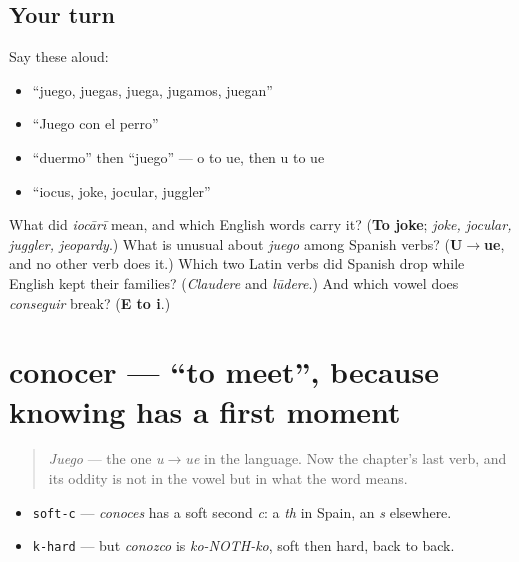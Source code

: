 \subsection*{Your turn}
Say these aloud:

\begin{itemize}
\raggedright
  \item \textquotedblleft{}juego, juegas, juega, jugamos, juegan\textquotedblright{}
  \item \textquotedblleft{}Juego con el perro\textquotedblright{}
  \item \textquotedblleft{}duermo\textquotedblright{} then \textquotedblleft{}juego\textquotedblright{} — o to ue, then u to ue
  \item \textquotedblleft{}iocus, joke, jocular, juggler\textquotedblright{}
\end{itemize}

\begin{tcolorbox}[breakable,colback=teal!4,colframe=teal!35!black,title={Before you move on}]
What did \emph{iocārī} mean, and which English words carry it? (\textbf{To joke}; \emph{joke, jocular, juggler, jeopardy}.) What is unusual about \emph{juego} among Spanish verbs? (\textbf{U$\to$ue}, and no other verb does it.) Which two Latin verbs did Spanish drop while English kept their families? (\emph{Claudere} and \emph{lūdere}.) And which vowel does \emph{conseguir} break? (\textbf{E to i}.)
\end{tcolorbox}
\section[conocer]{conocer — \textquotedblleft{}to meet\textquotedblright{}, because knowing has a first moment}

\label{lesson:ES-C39-conocer}



\begin{quote}
\emph{Juego} — the one \emph{u$\to$ue} in the language. Now the chapter's last verb, and its oddity is not in the vowel but in what the word means.
\end{quote}

\begin{sounds}
\begin{itemize}
\raggedright
  \item \texttt{soft-c} — \emph{conoces} has a soft second \emph{c}: a \emph{th} in Spain, an \emph{s} elsewhere.
  \item \texttt{k-hard} — but \emph{conozco} is \emph{ko-NOTH-ko}, soft then hard, back to back.
\end{itemize}
\end{sounds}

